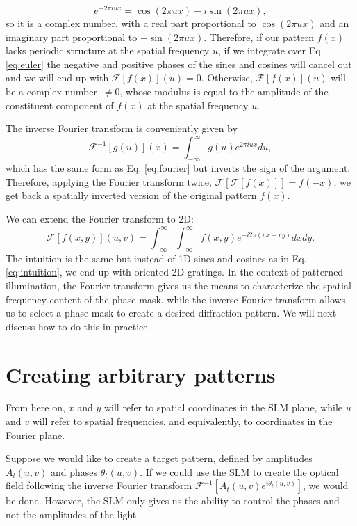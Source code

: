 \documentclass[a4paper]{report}
\begin{document}
\begin{equation}
	e ^ { - 2 \pi i u x } = \cos (2 \pi u x) - i \sin (2 \pi u x),
	\label{eq:intuition}
\end{equation}
so it is a complex number, with a real part proportional to $\cos (2 \pi u x)$ and an imaginary part proportional to $- \sin (2 \pi u x)$. Therefore, if our pattern $f(x)$ lacks periodic structure at the spatial frequency $u$, if we integrate over Eq. \ref{eq:euler} the negative and positive phases of the sines and cosines will cancel out and we will end up with $\mathscr{F}[f(x)](u) = 0$. Otherwise, $\mathscr{F}[f(x)](u)$ will be a complex number~$\neq 0$, whose modulus is equal to the amplitude of the constituent component of $f(x)$ at the spatial frequency $u$.

The inverse Fourier transform is conveniently given by
\begin{equation}
	\mathscr{F}^{-1}[g(u)] ( x ) = \int _ { - \infty } ^ { \infty } g ( u ) e ^ { 2 \pi i u x } d u,
	\label{eq:invfourier}
\end{equation}
which has the same form as Eq. \ref{eq:fourier} but inverts the sign of the argument. Therefore, applying the Fourier transform twice, $\mathscr{F}[\mathscr{F}[f(x)]] = f(-x)$, we get back a spatially inverted version of the original pattern $f(x)$.

We can extend the Fourier transform to 2D:
\begin{equation}
	\mathscr{F}[f(x,y)] ( u , v ) = \int _ { - \infty } ^ { \infty } \int _ { - \infty } ^ { \infty } f ( x , y ) e ^ { - i 2 \pi ( u x + v y ) } d x d y.
\end{equation}
The intuition is the same but instead of 1D sines and cosines as in Eq. \ref{eq:intuition}, we end up with oriented 2D gratings. In the context of patterned illumination, the Fourier transform gives us the means to characterize the spatial frequency content of the phase mask, while the inverse Fourier transform allows us to select a phase mask to create a desired diffraction pattern. We will next discuss how to do this in practice.
 
\section{Creating arbitrary patterns}
From here on, $x$ and $y$ will refer to spatial coordinates in the SLM plane, while $u$ and $v$ will refer to spatial frequencies, and equivalently, to coordinates in the Fourier plane.

Suppose we would like to create a target pattern, defined by amplitudes $A_t(u,v)$ and phases $\theta_t(u,v)$. If we could use the SLM to create the optical field following the inverse Fourier transform $\mathscr{F}^{-1}[A_t(u,v) e^{i\theta_t(u,v)}]$, we would be done. However, the SLM only gives us the ability to control the phases and not the amplitudes of the light.
\end{document}
